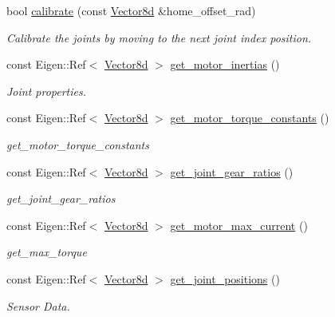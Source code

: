 \begin{DoxyCompactItemize}
bool \hyperlink{classblmc__robots_1_1Solo8_adb4de0ff0c5cc2159a1e3b2f32955198}{calibrate} (const \hyperlink{common__header_8hpp_a98975ffbe0bca1296078e0350dfedd60}{Vector8d} \&home\+\_\+offset\+\_\+rad)
\begin{DoxyCompactList}\small\item\em Calibrate the joints by moving to the next joint index position. \end{DoxyCompactList}\item 
const Eigen\+::\+Ref$<$ \hyperlink{common__header_8hpp_a98975ffbe0bca1296078e0350dfedd60}{Vector8d} $>$ \hyperlink{classblmc__robots_1_1Solo8_a61a01cd1309a28be108deb07eb4d2f3b}{get\+\_\+motor\+\_\+inertias} ()
\begin{DoxyCompactList}\small\item\em Joint properties. \end{DoxyCompactList}\item 
const Eigen\+::\+Ref$<$ \hyperlink{common__header_8hpp_a98975ffbe0bca1296078e0350dfedd60}{Vector8d} $>$ \hyperlink{classblmc__robots_1_1Solo8_acdc75776948c56c153ef59ed0bdf8222}{get\+\_\+motor\+\_\+torque\+\_\+constants} ()
\begin{DoxyCompactList}\small\item\em get\+\_\+motor\+\_\+torque\+\_\+constants \end{DoxyCompactList}\item 
const Eigen\+::\+Ref$<$ \hyperlink{common__header_8hpp_a98975ffbe0bca1296078e0350dfedd60}{Vector8d} $>$ \hyperlink{classblmc__robots_1_1Solo8_a1fc849d9d2dfd936fa00147e184b8e5a}{get\+\_\+joint\+\_\+gear\+\_\+ratios} ()
\begin{DoxyCompactList}\small\item\em get\+\_\+joint\+\_\+gear\+\_\+ratios \end{DoxyCompactList}\item 
const Eigen\+::\+Ref$<$ \hyperlink{common__header_8hpp_a98975ffbe0bca1296078e0350dfedd60}{Vector8d} $>$ \hyperlink{classblmc__robots_1_1Solo8_a8c956e9a0a891992fa593b932a385095}{get\+\_\+motor\+\_\+max\+\_\+current} ()
\begin{DoxyCompactList}\small\item\em get\+\_\+max\+\_\+torque \end{DoxyCompactList}\item 
const Eigen\+::\+Ref$<$ \hyperlink{common__header_8hpp_a98975ffbe0bca1296078e0350dfedd60}{Vector8d} $>$ \hyperlink{classblmc__robots_1_1Solo8_ab067a976ebce2882b84e2d115832839d}{get\+\_\+joint\+\_\+positions} ()
\begin{DoxyCompactList}\small\item\em Sensor Data. \end{DoxyCompactList}\item 

\end{DoxyCompactItemize}
